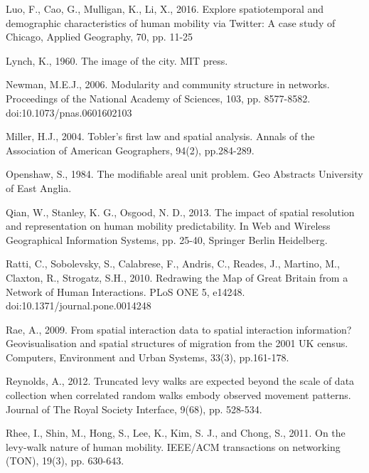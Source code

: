\documentclass[]{tGIS2e}
\begin{document}
\begin{thebibliography}{9}
Luo, F., Cao, G., Mulligan, K., Li, X., 2016. Explore spatiotemporal and demographic characteristics of human mobility via Twitter: A case study of Chicago, Applied Geography, 70, pp. 11-25

Lynch, K., 1960. The image of the city. MIT press.

Newman, M.E.J., 2006. Modularity and community structure in networks. Proceedings of the National Academy of Sciences, 103, pp. 8577-8582. doi:10.1073/pnas.0601602103

Miller, H.J., 2004. Tobler's first law and spatial analysis. Annals of the Association of American Geographers, 94(2), pp.284-289.

Openshaw, S., 1984. The modifiable areal unit problem. Geo Abstracts University of East Anglia.

Qian, W., Stanley, K. G., Osgood, N. D., 2013. The impact of spatial resolution and representation on human mobility predictability. In Web and Wireless Geographical Information Systems,  pp. 25-40, Springer Berlin Heidelberg.

Ratti, C., Sobolevsky, S., Calabrese, F., Andris, C., Reades, J., Martino, M., Claxton, R., Strogatz, S.H., 2010. Redrawing the Map of Great Britain from a Network of Human Interactions. PLoS ONE 5, e14248. doi:10.1371/journal.pone.0014248

Rae, A., 2009. From spatial interaction data to spatial interaction information? Geovisualisation and spatial structures of migration from the 2001 UK census. Computers, Environment and Urban Systems, 33(3), pp.161-178.

Reynolds, A., 2012. Truncated levy walks are expected beyond the scale of data collection when correlated random walks embody observed movement patterns. Journal of The Royal Society Interface, 9(68), pp. 528-534.

Rhee, I., Shin, M., Hong, S., Lee, K., Kim, S. J., and Chong, S., 2011. On the levy-walk nature of human mobility. IEEE/ACM transactions on networking (TON), 19(3), pp. 630-643.


\end{thebibliography}
\end{document}
